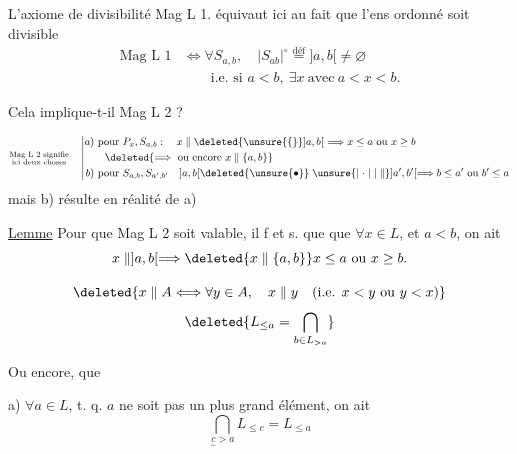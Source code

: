 L'axiome de divisibilité  Mag L 1. équivaut ici au fait que  l'ens ordonné soit divisible
\[
\begin{aligned}
 \text{Mag L }1&\Longleftrightarrow \forall S_{a,b},\quad |S_{ab}|^\circ\overset{\text{déf}}{=} ]a,b[\ne\varnothing\\
 &\qquad\text{i.e. si }a<b,\ \exists x\ \text{avec}\ a<x<b.
\end{aligned}
\]

Cela implique-t-il Mag L 2 ? 

\[
\begin{aligned}
 \substack{\text{Mag L 2 signifie}\\\text{ici deux choses}}\quad
 \left|\begin{aligned}
 a)&\ \text{pour }P_x,S_{a,b}:\quad
     x\parallel\deleted{\unsure{\{} }]a,b[\ \Longrightarrow x\leq a\ \text{ou}\ x\geq b\\
 &\quad\deleted{\Longrightarrow\text{ ou encore }x\parallel\{a,b\}}\\
 b)&\ \text{pour }S_{a,b},S_{a',b'}\quad
      ]a,b[\deleted{\unsure{\bullet}}\mathrel{\unsure{\mid\cdot\mid|\parallel}}]a',b'[
         \Longrightarrow b\leq a'\ \text{ou}\ b'\leq a
 \end{aligned}\right.
\end{aligned}
\]
mais b) résulte en réalité de a)  \deleted{$\Rightarrow\ \unsure{\{a,b\}}\parallel ]a',b'[$, et \unsure{on applique} a)}


\uline{Lemme} Pour que Mag L 2 soit valable, il f et s. que   que  $\forall x\in L$, et $a<b$, on ait
\[
 x\parallel ]a,b[ \Longrightarrow \deleted{x\parallel\{a,b\}} x\leq a\ \text{ou}\ x\geq b.
\]

\[
 \deleted{x\parallel A\Longleftrightarrow\forall y\in A,\quad x\parallel y\quad
         (\text{i.e. } x<y\ \text{ou}\ y<x)}
\]
\[
 \deleted{L_{\leq a}=\bigcap_{b\in L_{>a}}}
\]

Ou encore, que

 a) $\forall a\in L$, t. q. $a$ ne soit pas un plus grand élément, on ait
\[
 \bigcap_{\underset{\sim}{c}>a}L_{\leq c}=L_{\leq a}
\]

